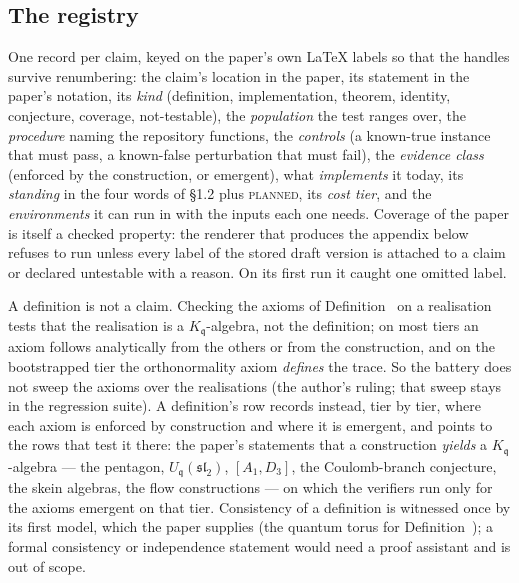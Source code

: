 \documentclass[11pt]{amsart}
\makeatletter
\newcommand\fq{\mathfrak{q}}
\theoremstyle{remark}
\newcommand{\pref}[1]{\@ifundefined{r@P-#1}{\textup{[\texttt{\detokenize{#1}}]}}{\ref{P-#1}}}
\newcommand{\PLANNED}{\textsc{planned}}
\makeatother
\begin{document}
\subsection{The registry}
One record per claim, keyed on the paper's own \LaTeX{} labels so that the
handles survive renumbering: the claim's location in the paper, its
statement in the paper's notation, its \emph{kind} (definition,
implementation, theorem, identity, conjecture, coverage, not-testable), the
\emph{population} the
test ranges over, the \emph{procedure} naming the repository functions, the
\emph{controls} (a known-true instance that must pass, a known-false
perturbation that must fail), the \emph{evidence class} (enforced by the
construction, or emergent), what \emph{implements} it today, its
\emph{standing} in the four words of \S1.2 plus \PLANNED{}, its \emph{cost
tier}, and the \emph{environments} it can run in with the inputs each one
needs.  Coverage of the paper is itself a checked property:
the renderer that produces the appendix below refuses to run unless every
label of the stored draft version is attached to a claim or declared
untestable with a reason.  On its first run it caught one omitted label.

A definition is not a claim.  Checking the axioms of Definition~\pref{def:kq}
on a realisation tests that the realisation is a $K_\fq$-algebra, not the
definition; on most tiers an axiom follows analytically from the others or
from the construction, and on the bootstrapped tier the orthonormality
axiom \emph{defines} the trace.  So the battery does not sweep the axioms
over the realisations (the author's ruling; that sweep stays in the
regression suite).  A definition's row records instead, tier by tier, where
each axiom is enforced by construction and where it is emergent, and points
to the rows that test it there: the paper's statements that a construction
\emph{yields} a $K_\fq$-algebra --- the pentagon, $U_\fq(\mathfrak{sl}_2)$,
$[A_1,D_3]$, the Coulomb-branch conjecture, the skein algebras, the flow
constructions --- on which the verifiers run only for the axioms emergent on
that tier.  Consistency of a definition is witnessed once by its first
model, which the paper supplies (the quantum torus for
Definition~\pref{def:kq}); a formal consistency or independence statement
would need a proof assistant and is out of scope.
\end{document}
